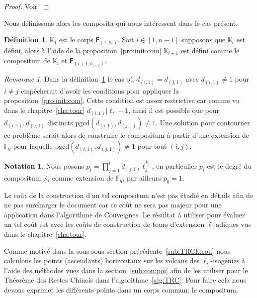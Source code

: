 \documentclass[10pt,a4paper]{book}
\theoremstyle{plain}
\theoremstyle{definition}
\theoremstyle{definition}
\theoremstyle{definition}
\theoremstyle{definition}
\theoremstyle{definition}
\newtheorem{defi}[thm]{Définition}
\theoremstyle{remark}
\newtheorem{rem}[thm]{Remarque}
\theoremstyle{remark}
\theoremstyle{definition}
\newtheorem{nota}[thm]{Notation}
\begin{document}
\begin{proof}
Voir \cite[Theorem 2]{BrawleyCarlitz87}
\end{proof}


Nous définissons alors les composita qui nous intéressent dans le cas présent.
\begin{defi}
\label{def:con:com}
$\mathbb{K}_1$ est le corps $\mathsf{F}_{(1,k_1)}$. Soit $i \in [1,n-1]$ 
supposons que $\mathbb{K}_{i}$ est défini, alors à 
l'aide de la proposition~\ref{pro:init:com} $\mathbb{K}_{i+1}$ est défini comme
le compositum de $\mathbb{K}_i$ et $\mathsf{F}_{(i+1,k_{i+1})}$.
\end{defi}
\begin{rem}
Dans la définition~\ref{def:con:com} le cas où $d_{(i,1)}=d_{(j,1)}$ avec $d_{(i,1)}
\neq 1$ pour $i \neq j$ empêcherait d'avoir les conditions pour appliquer la 
proposition~\ref{pro:init:com}. 
Cette condition est assez restrictive car comme vu dans le 
chapitre~\ref{cha:tour} $d_{(i,1)} | \ell_i-1$, ainsi il est possible que 
pour $d_{(i,1)},d_{(j,1)}$ distincts $\mathrm{pgcd}(d_{(i,1)},d_{(j,1)}) \neq 1$. Une 
solution pour contourner ce problème serait alors de construire le compositum à
partir d'une extension de $\mathbb{F}_q$ pour laquelle 
$\mathrm{pgcd}(d_{(i,1)},d_{(j,1)}) \neq 1$ pour tout $(i,j)$.
\end{rem}


\begin{nota} 
Nous posons $p_{i}=\prod_{j=1}^{i}d_{(j,1)}\ell_j^{k_j}$, en particulier $p_{i}$ est le 
degré du compositum $\mathbb{K}_i$ comme extension de $\mathbb{F}_q$, par 
ailleurs $p_0=1$.
\end{nota}

Le coût de la construction d'un tel compositum n'est pas étudié en détails afin 
de ne pas surcharger le document car ce coût ne sera pas majeur pour 
une application dans l'algorithme de Couveignes. Le résultat à utiliser pour 
évaluer un tel coût est \cite[Theorem 1]{BostanFlajoletSalvySchost06} avec 
les coûts de construction de tours d'extension $\ell$-adiques vus dans le 
chapitre~\ref{cha:tour}.


Comme motivé dans la sous sous section précédente~\ref{sub:TRCE:cou} nous
calculons les points (ascendants) horizontaux sur les volcans des 
$\ell_i$-isogénies à l'aide des méthodes vues dans la 
section~\ref{sub:con:poi} afin de les utiliser pour le Théorème des Restes 
Chinois dans l'algorithme~\ref{alg:TRC}. Pour faire cela nous devons exprimer 
les différents points dans un corps commun: le compositum. 
  
\end{document}
